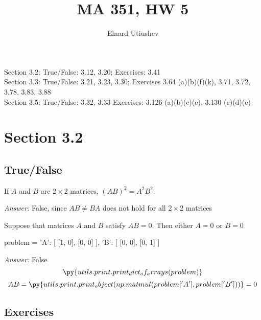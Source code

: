 \documentclass[letterpaper]{article}
\title{MA 351, HW 5}
\author{Elnard Utiushev}
\newcommand{\ans}{\textit{Answer: }}
\newenvironment{question}[2][Question]{\begin{trivlist}
\item[\hskip \labelsep {\bfseries #1}\hskip \labelsep {\bfseries #2.}]}{\end{trivlist}}
\newcommand{\printobj}[1]{\py{utils.print.print_object(#1)}}
\begin{document}
\maketitle

Section 3.2: True/False: 3.12, 3.20; Exercises: 3.41 \\
Section 3.3: True/False: 3.21, 3.23, 3.30; Exercises 3.64 (a)(b)(f)(k), 3.71, 3.72, 3.78, 3.83, 3.88 \\
Section 3.5: True/False: 3.32, 3.33 Exercises: 3.126 (a)(b)(c)(e), 3.130 (c)(d)(e)

\section{Section 3.2}
\subsection{True/False}

\begin{question}{3.12}
    If $A$ and $B$ are $2 \times 2$ matrices, $( A B ) ^ { 2 } = A ^ { 2 } B ^ { 2 }$.

    \ans False, since $AB \neq BA$ does not hold for all $2 \times 2$ matrices
\end{question}

\begin{question}{3.20}
    Suppose that matrices $A$ and $B$ satisfy $A B = 0 .$ Then either $A = 0$ or $B = 0$

\begin{pycode}
problem = {
  'A': [
    [1, 0],
    [0, 0]
  ],
  'B': [
    [0, 0],
    [0, 1]
  ]
}
\end{pycode}

    \ans False
    $$\py{utils.print.print_dict_of_arrays(problem)}$$
    $$AB = \printobj{np.matmul(problem['A'], problem['B'])} = 0$$
\end{question}

\subsection{Exercises}
\end{document}

